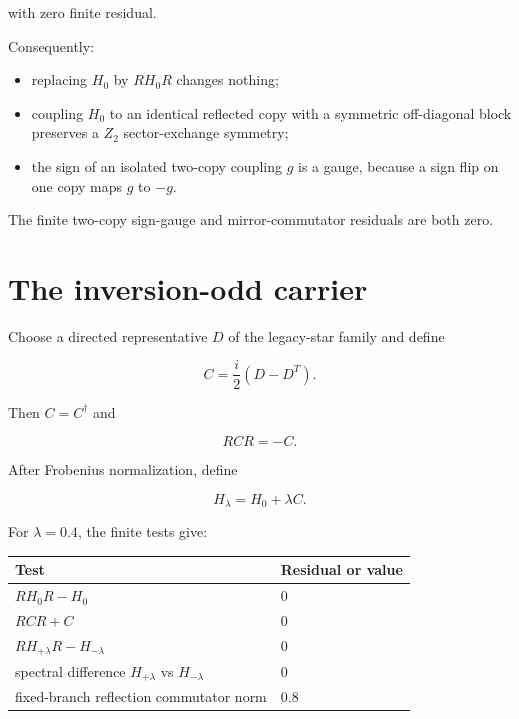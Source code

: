 \documentclass[11pt,a4paper,openany]{report}
\begin{document}
with zero finite residual.

Consequently:

\begin{itemize}
\item 
replacing \(H_0\) by \(RH_0R\) changes nothing;

\item 
coupling \(H_0\) to an identical reflected copy with a symmetric off-diagonal block preserves a \(Z_2\) sector-exchange symmetry;

\item 
the sign of an isolated two-copy coupling \(g\) is a gauge, because a sign flip on one copy maps \(g\) to \(-g\).

\end{itemize}

The finite two-copy sign-gauge and mirror-commutator residuals are both zero.

\section{The inversion-odd carrier}

Choose a directed representative \(D\) of the legacy-star family and define

\[
C
=
\frac{i}{2}(D-D^T).
\]

Then \(C=C^\dagger\) and

\[
RCR=-C.
\]

After Frobenius normalization, define

\[
H_\lambda=H_0+\lambda C.
\]

For \(\lambda=0.4\), the finite tests give:

\begin{center}
\begingroup\small
\setlength{\tabcolsep}{3.5pt}
\renewcommand{\arraystretch}{1.16}
\begin{longtable}{@{}p{}p{}@{}}
\toprule
\textbf{Test} & \textbf{Residual or value} \\
\midrule
\endhead
\(RH_0R-H_0\) & 0 \\
\(RCR+C\) & 0 \\
\(RH_{+\lambda}R-H_{-\lambda}\) & 0 \\
spectral difference \(H_{+\lambda}\) vs \(H_{-\lambda}\) & 0 \\
fixed-branch reflection commutator norm & 0.8 \\
\bottomrule
\end{longtable}
\endgroup
\end{center}
\end{document}
